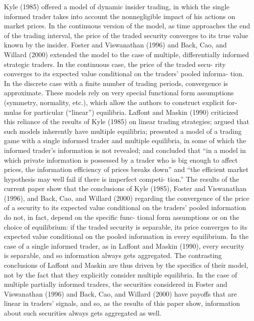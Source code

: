 {Kyle (1985) offered a model of dynamic insider trading, in which the single informed trader takes into account the nonnegligible impact of his actions on market prices. In the continuous version of the model, as time approaches the end of the trading interval, the price of the traded security converges to its true value known by the insider. Foster and Viswanathan (1996) and Back, Cao, and Willard (2000) extended the model to the case of multiple, differentially informed strategic traders. In the continuous case, the price of the traded secu- rity converges to its expected value conditional on the traders’ pooled informa- tion. In the discrete case with a finite number of trading periods, convergence is approximate. These models rely on very special functional form assumptions (symmetry, normality, etc.), which allow the authors to construct explicit for- mulas for particular (“linear”) equilibria. Laffont and Maskin (1990) criticized this reliance of the results of Kyle (1985) on linear trading strategies; argued that such models inherently have multiple equilibria; presented a model of a trading game with a single informed trader and multiple equilibria, in some of which the informed trader’s information is not revealed; and concluded that “in a model in which private information is possessed by a trader who is big enough to affect prices, the information efficiency of prices breaks down” and “the efficient market hypothesis may well fail if there is imperfect competi- tion.” The results of the current paper show that the conclusions of Kyle (1985), Foster and Viswanathan (1996), and Back, Cao, and Willard (2000) regarding the convergence of the price of a security to its expected value conditional on the traders’ pooled information do not, in fact, depend on the specific func- tional form assumptions or on the choice of equilibrium: if the traded security is separable, its price converges to its expected value conditional on the pooled information in every equilibrium. In the case of a single informed trader, as in Laffont and Maskin (1990), every security is separable, and so information always gets aggregated. The contrasting conclusions of Laffont and Maskin are thus driven by the specifics of their model, not by the fact that they explicitly consider multiple equilibria. In the case of multiple partially informed traders, the securities considered in Foster and Viswanathan (1996) and Back, Cao, and Willard (2000) have payoffs that are linear in traders’ signals, and so, as the results of this paper show, information about such securities always gets aggregated as well.

}
